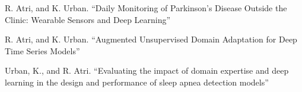 
\begin{itemize*}
  \item \label{itm:kevrooz3}
    R. Atri, and K. Urban.
    ``Daily Monitoring of Parkinson's Disease Outside the Clinic: Wearable Sensors and Deep Learning''
  \item \label{itm:kevrooz2}
    R. Atri, and K. Urban.
    ``Augmented Unsupervised Domain Adaptation for Deep Time Series Models''
  \item \label{itm:kevrooz1}
    Urban, K., and R. Atri.
    ``Evaluating the impact of domain expertise and deep learning in the design and performance of sleep apnea detection models''
\end{itemize*}

